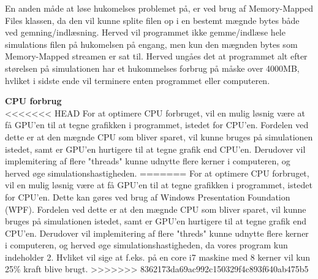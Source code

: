 En anden måde at løse hukomelses problemet på, er ved brug af Memory-Mapped Files klassen, da den vil kunne splite filen op i en bestemt mægnde bytes  både ved gemning/indlæsning. Herved vil programmet ikke gemme/indlæse hele simulations filen på hukomelsen på engang, men kun den mægnden bytes som Memory-Mapped streamen er sat til. Herved ungåes det at programmet alt efter størelsen på simulationen har et hukommelses forbrug på måske over 4000MB, hvliket i sidste ende vil terminere enten programmet eller computeren.

\vspace{5mm}

\textbf{CPU forbrug} \\
<<<<<<< HEAD
For at optimere CPU forbruget, vil en mulig løsnig være at få GPU'en til at tegne grafikken i programmet, istedet for CPU'en. Fordelen ved dette er at den mægnde CPU som bliver sparet,  vil kunne bruges på simulationen istedet, samt er GPU'en hurtigere til at tegne grafik end CPU'en. Derudover vil implemitering af flere "threads" kunne udnytte flere kerner i computeren, og herved øge simulationshastigheden.
=======
For at optimere CPU forbruget, vil en mulig løsnig være at få GPU'en til at tegne grafikken i programmet, istedet for CPU'en. Dette kan gøres ved brug af Windows Presentation Foundation (WPF). Fordelen ved dette er at den mægnde CPU som bliver sparet,  vil kunne bruges på simulationen istedet, samt er GPU'en hurtigere til at tegne grafik end CPU'en. Derudover vil implemitering af flere "threds" kunne udnytte flere kerner i computeren, og herved øge simulationshastigheden, da vores program kun indeholder 2. Hvliket vil sige at f.eks. på en core i7 maskine med 8 kerner vil kun 25\% kraft blive brugt.
>>>>>>> 8362173da69ac992c150329f4c893f640ab475b5






